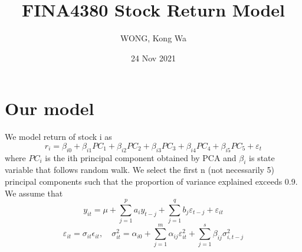 \documentclass{article}
\title{FINA4380 Stock Return Model}
\author{WONG, Kong Wa}
\date{24 Nov 2021}
\begin{document}
\maketitle
\raggedright
\section{Our model}
We model return of stock i as
\begin{equation*}
	r_i=\beta_{i0}+\beta_{i1}PC_1+\beta_{i2}PC_2+\beta_{i3}PC_3+\beta_{i4}PC_4+\beta_{i5}PC_5+\varepsilon_t
\end{equation*}
where $PC_i$ is the ith principal component obtained by PCA and $\beta_i$ is state variable that follows random walk.
We select the first n (not necessarily 5) principal components such that the proportion of variance explained exceeds 0.9. \\
We assume that
\begin{equation*}
	y_{it}=\mu+\sum_{j=1}^p a_i y_{t-j}+\sum_{j=1}^q b_j \varepsilon_{t-j}+\varepsilon_{it}
\end{equation*}
\begin{equation*}
	\varepsilon_{it}=\sigma_{it} \epsilon_{it}, \quad \sigma_{it}^2=\alpha_{i0}+\sum_{j=1}^m \alpha_{ij} \varepsilon_{it}^2+\sum_{j=1}^s \beta_{ij} \sigma_{i,t-j}^2
\end{equation*}
\end{document}
